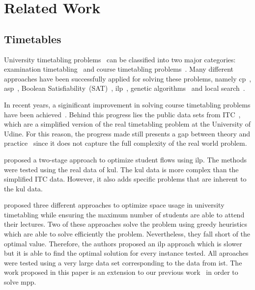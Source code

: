 \documentclass[twocolumn,natbib]{svjour3}          %
\newcommand{\uni}{\gls{ist}}
\begin{document}
\section{Related Work}\label{sec:rel}
\subsection{Timetables}
University timetabling problems~\citep{DBLP:series/sci/Kingston13,mccollum2006university,DBLP:journals/anor/VrielinkJHH19}  can be classified into two major categories: examination timetabling~\citep{M2009} and course timetabling problems~\citep{di2007second}. Many different approaches have been successfully applied for solving these problems, namely  \gls{cp}~\citep{DBLP:conf/patat/MullerRB04}, \gls{asp}~\citep{DBLP:journals/anor/BanbaraIKOSSTW19}, Boolean Satisfiability~(SAT)~\citep{DBLP:journals/anor/AchaN14}, \gls{ilp}~\citep{LEMOS2018100092,LINDAHL2019,DBLP:conf/wea/LachL08,DBLP:journals/eor/VermuytenLMB16,DBLP:journals/cor/CacchianiCRT13}, genetic algorithms~\citep{DBLP:journals/anor/PillayO19} and local search~\citep{LEMOS2018100092,DBLP:conf/patat/grasp,DBLP:journals/scheduling/BellioGS12}.

In recent years, a siginificant improvement in solving course timetabling problems have been achieved~\citep{Bettinelli2015}. Behind this progress lies the public data sets from ITC~\citep{di2007second}, which are a simplified version of the real timetabling problem at the University of Udine. For this reason, the progress made still presents a gap between theory and practice~\citep{mccollum2006university} since it does not capture the full complexity of the real world problem.

\cite{DBLP:journals/eor/VermuytenLMB16} proposed a two-stage approach to optimize student flows using \gls{ilp}. The methods were tested using the real data of \gls{kul}. The \gls{kul} data is more complex than the simplified ITC data. However, it also adds specific problems that are inherent to the \gls{kul} data.


\cite{LEMOS2018100092} proposed three different approaches to optimize space usage in university timetabling while ensuring the maximum number of students are able to attend their lectures. Two of these approaches solve the problem using greedy heuristics which are able to solve efficiently the problem. Nevertheless, they fall short of the optimal value. Therefore, the authors proposed an \gls{ilp} approach which is slower but it is able to find the optimal solution for every instance tested. All aproaches were tested using a very large data set corresponding to the data from \uni. The work proposed in this paper is an extension to our previous work~\citep{LEMOS2018100092} in order to solve \gls{mpp}.  %
  
\end{document}
